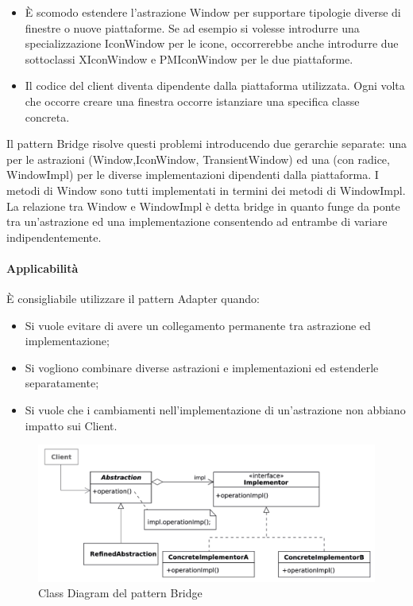 \begin{itemize}
    \item È scomodo estendere l’astrazione Window per supportare tipologie diverse di finestre o nuove piattaforme. Se ad esempio si volesse introdurre una specializzazione IconWindow per le icone, occorrerebbe anche introdurre due sottoclassi XIconWindow e PMIconWindow per le due piattaforme.
    \item Il codice del client diventa dipendente dalla piattaforma utilizzata. Ogni volta che occorre creare una finestra occorre istanziare una specifica classe concreta.
\end{itemize}

Il pattern Bridge risolve questi problemi introducendo due gerarchie separate: una per le astrazioni (Window,IconWindow, TransientWindow) ed una (con radice, WindowImpl) per le diverse implementazioni dipendenti dalla piattaforma. I metodi di Window sono tutti implementati in termini dei metodi di WindowImpl. La relazione tra Window e WindowImpl è detta bridge in quanto funge da ponte tra un’astrazione ed una implementazione consentendo ad entrambe di variare indipendentemente.

\paragraph{Applicabilità} È consigliabile utilizzare il pattern Adapter quando:
\begin{itemize}
    \item Si vuole evitare di avere un collegamento permanente tra astrazione ed implementazione;
    \item Si vogliono combinare diverse astrazioni e implementazioni ed estenderle separatamente;
    \item Si vuole che i cambiamenti nell'implementazione di un'astrazione non abbiano impatto sui Client.
\end{itemize}

\begin{figure}[H]
    \centering
    \includegraphics[width=0.75\linewidth]{assets/pattern/bridge/bridge-struttura.png}
    \caption{Class Diagram del pattern Bridge}
\end{figure}

